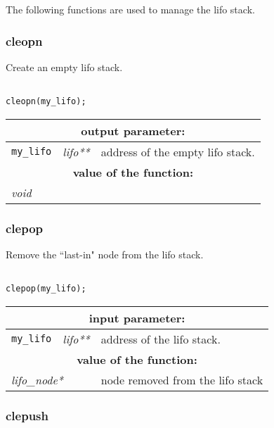 \vskip 1.0cm

The following functions are used to manage the lifo stack.

\vskip 0.8cm
\goodbreak

\subsubsection {cleopn}

Create an empty lifo stack.

\begin{verbatim}

cleopn(my_lifo);
\end{verbatim}

\noindent
\begin{tabular}{|p{1.5cm}|p{2cm}|p{11cm}|}
\hline
\multicolumn{3}{|c|}{\bf output parameter:} \\
\hline
{\tt my\_lifo} & {\it lifo**} & address of the empty lifo stack. \\
\hline
\multicolumn{3}{|c|}{\bf value of the function:} \\
\hline
\multicolumn{2}{|l|}{\it void} &  \\
\hline
\end{tabular}

\subsubsection{clepop}

Remove the ``last-in" node from the lifo stack.

\begin{verbatim}

clepop(my_lifo);
\end{verbatim}

\noindent
\begin{tabular}{|p{1.5cm}|p{2cm}|p{11cm}|}
\hline
\multicolumn{3}{|c|}{\bf input parameter:} \\
\hline
{\tt my\_lifo} & {\it lifo**} & address of the lifo stack. \\
\hline
\multicolumn{3}{|c|}{\bf value of the function:} \\
\hline
\multicolumn{2}{|l|}{\it lifo\_node*} & node removed from the lifo stack \\
\hline
\end{tabular}

\subsubsection{clepush}

